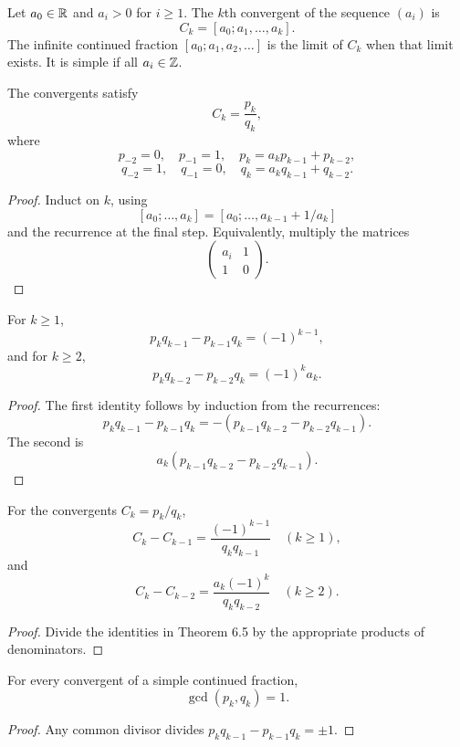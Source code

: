 \begin{de}
Let $a_0\in\mathbb{R}$ and $a_i>0$ for $i\ge1$.  The $k$th convergent of the sequence $(a_i)$ is
\[
 C_k=[a_0;a_1,\ldots,a_k].
\]
The infinite continued fraction $[a_0;a_1,a_2,\ldots]$ is the limit of $C_k$ when that limit exists.  It is simple if all $a_i\in\mathbb{Z}$.
\end{de}

\begin{thm}
The convergents satisfy
\[
 C_k=\frac{p_k}{q_k},
\]
where
\[
 p_{-2}=0,\quad p_{-1}=1,\quad p_k=a_kp_{k-1}+p_{k-2},
\]
\[
 q_{-2}=1,\quad q_{-1}=0,\quad q_k=a_kq_{k-1}+q_{k-2}.
\]
\end{thm}
\begin{proof}
Induct on $k$, using
\[
 [a_0;\ldots,a_k]
 =[a_0;\ldots,a_{k-1}+1/a_k]
\]
and the recurrence at the final step.  Equivalently, multiply the matrices
\[
 \begin{pmatrix}a_i&1\\1&0\end{pmatrix}.
\]
\end{proof}

\begin{thm}
For $k\ge1$,
\[
 p_kq_{k-1}-p_{k-1}q_k=(-1)^{k-1},
\]
and for $k\ge2$,
\[
 p_kq_{k-2}-p_{k-2}q_k=(-1)^k a_k.
\]
\end{thm}
\begin{proof}
The first identity follows by induction from the recurrences:
\[
 p_kq_{k-1}-p_{k-1}q_k
 =-(p_{k-1}q_{k-2}-p_{k-2}q_{k-1}).
\]
The second is
\[
 a_k(p_{k-1}q_{k-2}-p_{k-2}q_{k-1}).
\]
\end{proof}

\begin{thm}
For the convergents $C_k=p_k/q_k$,
\[
 C_k-C_{k-1}=\frac{(-1)^{k-1}}{q_kq_{k-1}}
 \quad(k\ge1),
\]
and
\[
 C_k-C_{k-2}=\frac{a_k(-1)^k}{q_kq_{k-2}}
 \quad(k\ge2).
\]
\end{thm}
\begin{proof}
Divide the identities in Theorem 6.5 by the appropriate products of denominators.
\end{proof}

\begin{thm}
For every convergent of a simple continued fraction,
\[
 \gcd(p_k,q_k)=1.
\]
\end{thm}
\begin{proof}
Any common divisor divides
$p_kq_{k-1}-p_{k-1}q_k=\pm1$.
\end{proof}

